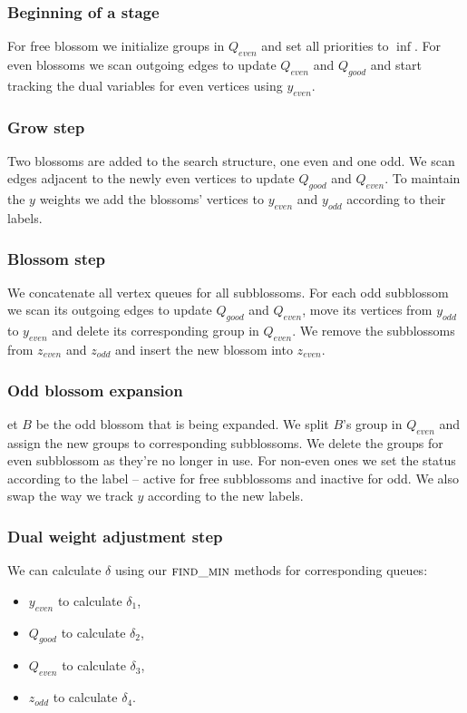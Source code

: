\subsubsection*{Beginning of a stage}
For free blossom we initialize groups in $Q_{even}$ and set all priorities to $\inf$. For even blossoms we  scan outgoing edges to update $Q_{even}$ and $Q_{good}$ and start tracking the dual variables for even vertices using $y_{even}$.

\subsubsection*{Grow step}
Two blossoms are added to the search structure, one even and one odd. We scan edges adjacent to the newly even vertices to update $Q_{good}$ and $Q_{even}$. To maintain the $y$ weights we add the blossoms' vertices to $y_{even}$ and $y_{odd}$ according to their labels.

\subsubsection*{Blossom step}
We concatenate all vertex queues for all subblossoms. For each odd subblossom we scan its outgoing edges to update $Q_{good}$ and $Q_{even}$, move its vertices from $y_{odd}$ to $y_{even}$ and delete its corresponding group in $Q_{even}$. We remove the subblossoms from $z_{even}$ and $z_{odd}$ and insert the new blossom into $z_{even}$.

\subsubsection*{Odd blossom expansion}
et $B$ be the odd blossom that is being expanded. We split $B$'s group in $Q_{even}$ and assign the new groups to corresponding subblossoms. We delete the groups for even subblossom as they're no longer in use. For non-even ones we set the status according to the label – active for free subblossoms and inactive for odd. We also swap the way we track $y$ according to the new labels.

\subsubsection*{Dual weight adjustment step} We can calculate $\delta$ using our $\textsc{find\_min}$ methods for corresponding queues: 
\begin{itemize}
    \item $y_{even}$ to calculate $\delta_1$,
    \item $Q_{good}$ to calculate $\delta_2$,
    \item $Q_{even}$ to calculate $\delta_3$,
    \item $z_{odd}$ to calculate $\delta_4$.
\end{itemize}

